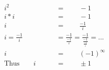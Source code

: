 \begin{align*}
i^2\qquad&\,=\qquad-1\\
i*i\qquad&\,=\qquad-1\\
i\qquad&\,=\qquad\frac{-1}{i}\\
i=\frac{-1}{i}&\,=\frac{-1}{\frac{-1}{i}}=\frac{-1}{\frac{-1}{\frac{-1}{i}}}=...\\
i\qquad&\,=\qquad(-1)^\infty\\
\mathrm{Thus}\qquad i\qquad&\,=\qquad\pm1
\end{align*}
